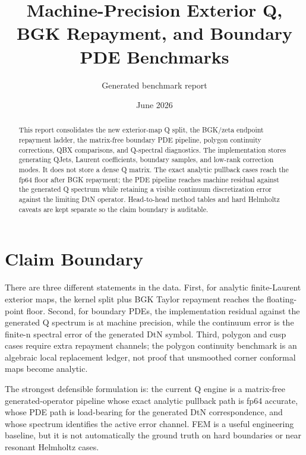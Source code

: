 \documentclass[10pt]{article}
\begin{document}
\title{Machine-Precision Exterior Q, BGK Repayment, and Boundary PDE Benchmarks}
\author{Generated benchmark report}
\date{June 2026}
\maketitle
\begin{abstract}
This report consolidates the new exterior-map Q split, the BGK/zeta endpoint repayment ladder, the matrix-free boundary PDE pipeline, polygon continuity corrections, QBX comparisons, and Q-spectral diagnostics.  The implementation stores generating QJets, Laurent coefficients, boundary samples, and low-rank correction modes.  It does not store a dense Q matrix.  The exact analytic pullback cases reach the fp64 floor after BGK repayment; the PDE pipeline reaches machine residual against the generated Q spectrum while retaining a visible continuum discretization error against the limiting DtN operator.  Head-to-head method tables and hard Helmholtz caveats are kept separate so the claim boundary is auditable.
\end{abstract}
\tableofcontents
\newpage
\section{Claim Boundary}
There are three different statements in the data.  First, for analytic finite-Laurent exterior maps, the kernel split plus BGK Taylor repayment reaches the floating-point floor.  Second, for boundary PDEs, the implementation residual against the generated Q spectrum is at machine precision, while the continuum error is the finite-n spectral error of the generated DtN symbol.  Third, polygon and cusp cases require extra repayment channels; the polygon continuity benchmark is an algebraic local replacement ledger, not proof that unsmoothed corner conformal maps become analytic.

The strongest defensible formulation is: the current Q engine is a matrix-free generated-operator pipeline whose exact analytic pullback path is fp64 accurate, whose PDE path is load-bearing for the generated DtN correspondence, and whose spectrum identifies the active error channel.  FEM is a useful engineering baseline, but it is not automatically the ground truth on hard boundaries or near resonant Helmholtz cases.
\end{document}
